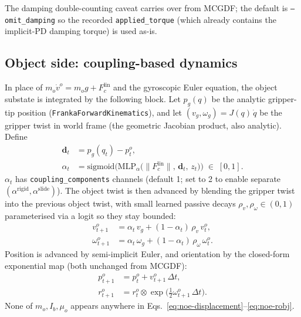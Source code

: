 \documentclass[11pt]{article}
\begin{document}
The damping double-counting caveat carries over from MCGDF; the
default is \texttt{--omit\_damping} so the recorded
\texttt{applied\_torque} (which already contains the implicit-PD
damping torque) is used as-is.

\subsection{Object side: coupling-based dynamics}
\label{sec:object-side}

In place of
$m_o\dot v^o = m_o g + F_c^{\mathrm{lin}}$ and the gyroscopic Euler
equation, the object substate is integrated by the following block.
Let $p_g(q)$ be the analytic gripper-tip position
(\texttt{FrankaForwardKinematics}), and let
$(v_g, \omega_g) = J(q)\,\dot q$ be the gripper twist in world frame
(the geometric Jacobian product, also analytic).  Define
\begin{align}
  \mathbf{d}_t &= p_g(q_t) - p^o_t, \label{eq:noe-displacement}\\
  \alpha_t &= \mathrm{sigmoid}\!\bigl(\mathrm{MLP}_\alpha\bigl(\|F_c^{\mathrm{lin}}\|,\,\mathbf{d}_t,\,z_t\bigr)\bigr) \;\in\;[0,1]. \label{eq:noe-alpha}
\end{align}
$\alpha_t$ has \texttt{coupling\_components} channels (default 1; set
to 2 to enable separate $(\alpha^{\mathrm{rigid}},
\alpha^{\mathrm{slide}})$).  The object twist is then advanced by
blending the gripper twist into the previous object twist, with small
learned passive decays $\rho_v, \rho_\omega \in (0,1)$
parameterised via a logit so they stay bounded:
\begin{align}
  v^o_{t+1}      &= \alpha_t\,v_g + (1-\alpha_t)\,\rho_v\,v^o_t,      \label{eq:noe-vobj}\\
  \omega^o_{t+1} &= \alpha_t\,\omega_g + (1-\alpha_t)\,\rho_\omega\,\omega^o_t. \label{eq:noe-womega}
\end{align}
Position is advanced by semi-implicit Euler, and orientation by the
closed-form exponential map (both unchanged from MCGDF):
\begin{align}
  p^o_{t+1} &= p^o_t + v^o_{t+1}\,\Delta t, \label{eq:noe-pobj}\\
  r^o_{t+1} &= r^o_t \otimes \exp\!\bigl(\tfrac{1}{2}\omega^o_{t+1}\,\Delta t\bigr). \label{eq:noe-robj}
\end{align}
None of $m_o,I_b,\mu_o$ appears anywhere in
Eqs.~\eqref{eq:noe-displacement}--\eqref{eq:noe-robj}.
\end{document}

